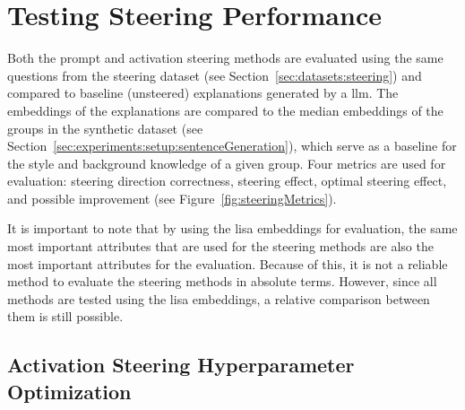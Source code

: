 \begin{table}[ht]
\begin{subtable}[t]{0.49\linewidth}
  \end{subtable}
  \hfill
  \begin{subtable}[t]{0.49\linewidth}
    \label{table:embedder:mediansForeignDomain}
    \resultEmbedderToMediansForeignDomain{}
  \end{subtable}
\end{table}

\section{Testing Steering Performance}%
\label{sec:evaluation:steering}

Both the prompt and activation steering methods are evaluated using the same questions from the steering dataset (see Section~\ref{sec:datasets:steering}) and compared to baseline (unsteered) explanations generated by a \acl{llm}. The embeddings of the explanations are compared to the median embeddings of the groups in the synthetic dataset (see Section~\ref{sec:experiments:setup:sentenceGeneration}), which serve as a baseline for the style and background knowledge of a given group. Four metrics are used for evaluation: steering direction correctness, steering effect, optimal steering effect, and possible improvement (see Figure~\ref{fig:steeringMetrics}).

It is important to note that by using the \ac{lisa} embeddings for evaluation, the same most important attributes that are used for the steering methods are also the most important attributes for the evaluation. Because of this, it is not a reliable method to evaluate the steering methods in absolute terms. However, since all methods are tested using the \ac{lisa} embeddings, a relative comparison between them is still possible.

\subsection{Activation Steering Hyperparameter Optimization}%
\label{sec:evaluation:steering:activationHPO}

